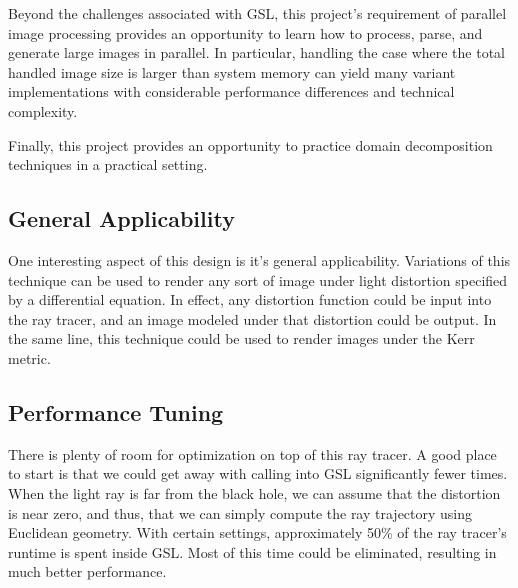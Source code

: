 Beyond the challenges associated with GSL, this project's requirement of parallel image processing provides an opportunity to learn how to process, parse, and generate large images in parallel. In particular, handling the case where the total handled image size is larger than system memory can yield many variant implementations with considerable performance differences and technical complexity. 

Finally, this project provides an opportunity to practice domain decomposition techniques in a practical setting. %


\subsection{General Applicability}
One interesting aspect of this design is it's general applicability. Variations of this technique can be used to render any sort of image under light distortion specified by a differential equation. In effect, any distortion function could be input into the ray tracer, and an image modeled under that distortion could be output. In the same line, this technique could be used to render images under the Kerr metric.


\subsection{Performance Tuning}
There is plenty of room for optimization on top of this ray tracer. A good place to start is that we could get away with calling into GSL significantly fewer times. When the light ray is far from the black hole, we can assume that the distortion is near zero, and thus, that we can simply compute the ray trajectory using Euclidean geometry. With certain settings, approximately 50\% of the ray tracer's runtime is spent inside GSL. Most of this time could be eliminated, resulting in much better performance. 






